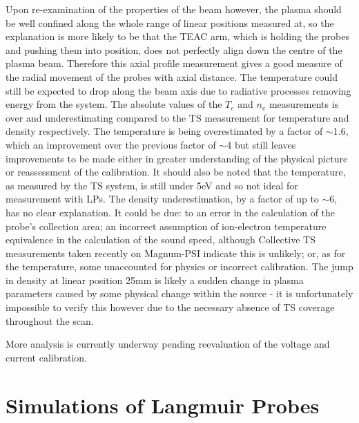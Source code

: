 \documentclass[a4paper, 12pt]{article} %
\begin{document}
	Upon re-examination of the properties of the beam however, the plasma should be well confined along the whole range of linear positions measured at, so the explanation is more likely to be that the TEAC arm, which is holding the probes and pushing them into position, does not perfectly align down the centre of the plasma beam. 
	Therefore this axial profile measurement gives a good measure of the radial movement of the probes with axial distance. 
	The temperature could still be expected to drop along the beam axis due to radiative processes removing energy from the system. 
	The absolute values of the $T_e$ and $n_e$ measurements is over and underestimating compared to the TS measurement for temperature and density respectively. 
	The temperature is being overestimated by a factor of $\sim$1.6, which an improvement over the previous factor of $\sim$4 but still leaves improvements to be made either in greater understanding of the physical picture or reassessment of the calibration. 
	It should also be noted that the temperature, as measured by the TS system, is still under 5eV and so not ideal for measurement with LPs.
	The density underestimation, by a factor of up to $\sim$6, has no clear explanation. 
	It could be due: to an error in the calculation of the probe's collection area; an incorrect assumption of ion-electron temperature equivalence in the calculation of the sound speed, although Collective TS measurements taken recently on Magnum-PSI indicate this is unlikely; or, as for the temperature, some unaccounted for physics or incorrect calibration.
	The jump in density at linear position 25mm is likely a sudden change in plasma parameters caused by some physical change within the source - it is unfortunately impossible to verify this however due to the necessary absence of TS coverage throughout the scan.
	
	More analysis is currently underway pending reevaluation of the voltage and current calibration. 


\section{\label{sec:lpsims}Simulations of Langmuir Probes}
\end{document}
